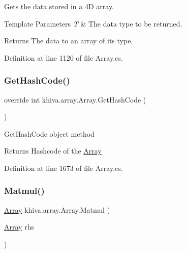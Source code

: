 Gets the data stored in a 4D array. 


\begin{DoxyTemplParams}{Template Parameters}
{\em T} & The data type to be returned.\\
\hline
\end{DoxyTemplParams}
\begin{DoxyReturn}{Returns}
The data to an array of its type.
\end{DoxyReturn}


Definition at line 1120 of file Array.\+cs.

\mbox{\label{classkhiva_1_1array_1_1_array_a35f31b244d648799ebd9d7294950551a}} 
\subsubsection{\texorpdfstring{Get\+Hash\+Code()}{GetHashCode()}}
{\footnotesize\ttfamily override int khiva.\+array.\+Array.\+Get\+Hash\+Code (\begin{DoxyParamCaption}{ }\end{DoxyParamCaption})\hspace{0.3cm}{\ttfamily [inline]}}



Get\+Hash\+Code object method 

\begin{DoxyReturn}{Returns}
Hashcode of the \mbox{\hyperlink{classkhiva_1_1array_1_1_array}{Array}}
\end{DoxyReturn}


Definition at line 1673 of file Array.\+cs.

\mbox{\label{classkhiva_1_1array_1_1_array_af2ca1ae045713c110a401ccb1938b8d0}} 
\subsubsection{\texorpdfstring{Matmul()}{Matmul()}}
{\footnotesize\ttfamily \mbox{\hyperlink{classkhiva_1_1array_1_1_array}{Array}} khiva.\+array.\+Array.\+Matmul (\begin{DoxyParamCaption}\item[{\mbox{\hyperlink{classkhiva_1_1array_1_1_array}{Array}}}]{rhs }\end{DoxyParamCaption})\hspace{0.3cm}{\ttfamily [inline]}}



